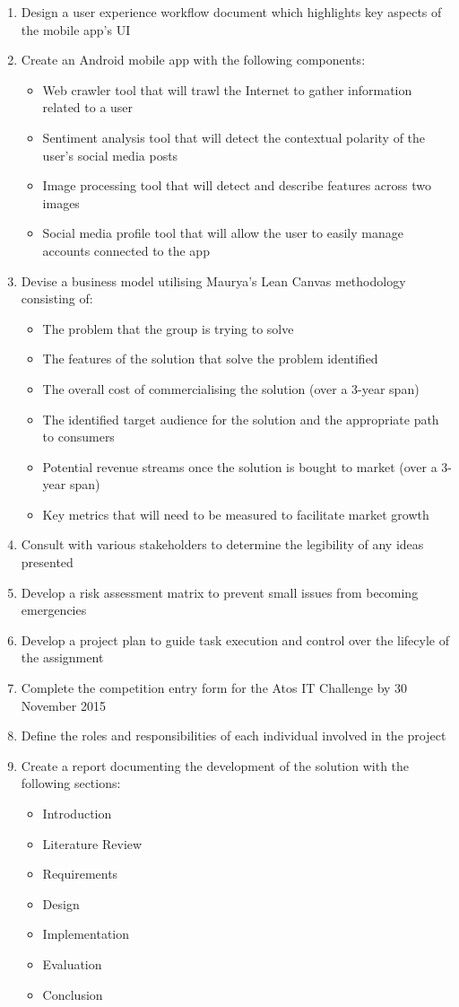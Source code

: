\begin{enumerate}
	\item Design a user experience workflow document which highlights key aspects of the mobile app's UI
	\item Create an Android mobile app with the following components:
		\begin{itemize}
			\item Web crawler tool that will trawl the Internet to gather information related to a user
			\item Sentiment analysis tool that will detect the contextual polarity of the user's social media posts
			\item Image processing tool that will detect and describe features across two images
			\item Social media profile tool that will allow the user to easily manage accounts connected to the app
		\end{itemize}
	\item Devise a business model utilising Maurya's Lean Canvas methodology consisting of:
		\begin{itemize}
			\item The problem that the group is trying to solve
			\item The features of the solution that solve the problem identified 
			\item The overall cost of commercialising the solution (over a 3-year span)
			\item The identified target audience for the solution and the appropriate path to consumers
			\item Potential revenue streams once the solution is bought to market (over a 3-year span)
			\item Key metrics that will need to be measured to facilitate market growth
		\end{itemize}
	\item Consult with various stakeholders to determine the legibility of any ideas presented
	\item Develop a risk assessment matrix to prevent small issues from becoming emergencies
	\item Develop a project plan to guide task execution and control over the lifecyle of the assignment
	\item Complete the competition entry form for the Atos IT Challenge by 30 November 2015
	\item Define the roles and responsibilities of each individual involved in the project 
	\item Create a report documenting the development of the solution with the following sections:
		\begin{itemize}
			\item Introduction
			\item Literature Review
			\item Requirements
			\item Design
			\item Implementation
			\item Evaluation
			\item Conclusion
		\end{itemize}
\end{enumerate}

